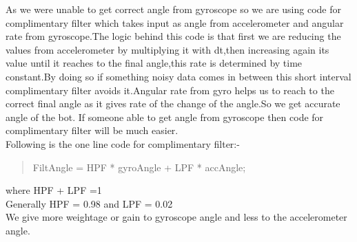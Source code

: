 \documentclass[12pt]{report}
\begin{document}
As we were unable to get correct angle from gyroscope so we are using code for complimentary filter which takes input as angle from accelerometer and angular rate from gyroscope.The logic behind this code is that first we are reducing the values from accelerometer by multiplying it with dt,then increasing again its value until it reaches to the final angle,this rate is determined by time constant.By doing so if something noisy data comes in between this short interval complimentary filter avoids it.Angular rate from gyro helps us to reach to the correct final angle as it gives rate of the change of the angle.So we get accurate angle of the bot.
If someone able to get angle from gyroscope then code for complimentary filter will be much easier.\\
Following is the one line code for complimentary filter:-
\begin{quote}
	\centering FiltAngle = HPF * gyroAngle + LPF * accAngle;
\end{quote}
where HPF + LPF =1 \\
Generally HPF = 0.98 and LPF = 0.02 \\
We give more weightage or gain to gyroscope angle and less to the accelerometer angle.
 
\end{document}

